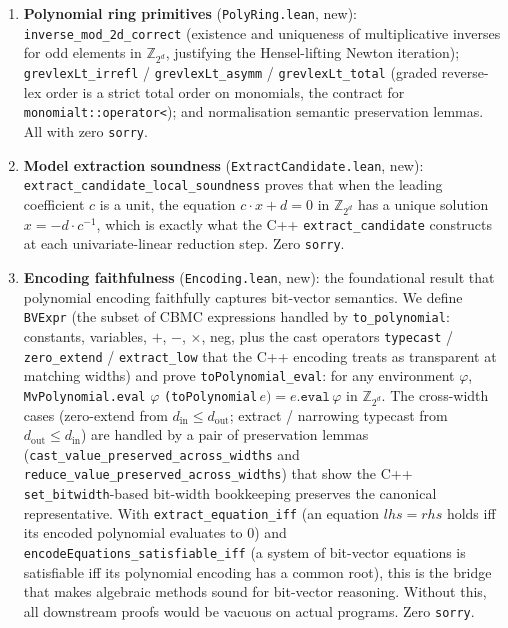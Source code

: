 \documentclass[runningheads]{llncs}
\begin{document}
\begin{enumerate}
\item \textbf{Polynomial ring primitives} (\texttt{PolyRing.lean},
  new): \texttt{inverse\_mod\_2d\_correct} (existence and
  uniqueness of multiplicative inverses for odd elements in
  $\mathbb{Z}_{2^d}$, justifying the Hensel-lifting Newton
  iteration); \texttt{grevlexLt\_irrefl} /
  \texttt{grevlexLt\_asymm} / \texttt{grevlexLt\_total} (graded
  reverse-lex order is a strict total order on monomials, the
  contract for \texttt{monomialt::operator<}); and normalisation
  semantic preservation lemmas. All with zero \texttt{sorry}.

\item \textbf{Model extraction soundness} (\texttt{ExtractCandidate.lean},
  new): \texttt{extract\_candidate\_local\_soundness} proves that
  when the leading coefficient $c$ is a unit, the equation
  $c \cdot x + d = 0$ in $\mathbb{Z}_{2^d}$ has a unique solution
  $x = -d \cdot c^{-1}$, which is exactly what the C++
  \texttt{extract\_candidate} constructs at each univariate-linear
  reduction step. Zero \texttt{sorry}.

\item \textbf{Encoding faithfulness} (\texttt{Encoding.lean}, new):
  the foundational result that polynomial encoding faithfully
  captures bit-vector semantics. We define \texttt{BVExpr} (the
  subset of CBMC expressions handled by \texttt{to\_polynomial}:
  constants, variables, $+$, $-$, $\times$, neg, plus the cast
  operators \texttt{typecast} / \texttt{zero\_extend} /
  \texttt{extract\_low} that the C++ encoding treats as
  transparent at matching widths) and prove
  \texttt{toPolynomial\_eval}: for any environment $\varphi$,
  \texttt{MvPolynomial.eval} $\varphi$
  \texttt{(toPolynomial}\,$e\texttt{)} = e\texttt{.eval}\,\varphi$
  in $\mathbb{Z}_{2^d}$. The cross-width cases (zero-extend
  from $d_\mathrm{in} \leq d_\mathrm{out}$; extract / narrowing
  typecast from $d_\mathrm{out} \leq d_\mathrm{in}$) are handled
  by a pair of preservation lemmas
  (\texttt{cast\_value\_preserved\_across\_widths} and
  \texttt{reduce\_value\_preserved\_across\_widths}) that show
  the C++ \texttt{set\_bitwidth}-based bit-width bookkeeping
  preserves the canonical representative. With
  \texttt{extract\_equation\_iff}
  (an equation $\mathit{lhs} = \mathit{rhs}$ holds iff its
  encoded polynomial evaluates to $0$) and
  \texttt{encodeEquations\_satisfiable\_iff} (a system of
  bit-vector equations is satisfiable iff its polynomial
  encoding has a common root), this is the bridge that makes
  algebraic methods sound for bit-vector reasoning. Without this,
  all downstream proofs would be vacuous on actual programs.
  Zero \texttt{sorry}.


\end{enumerate}
\end{document}
